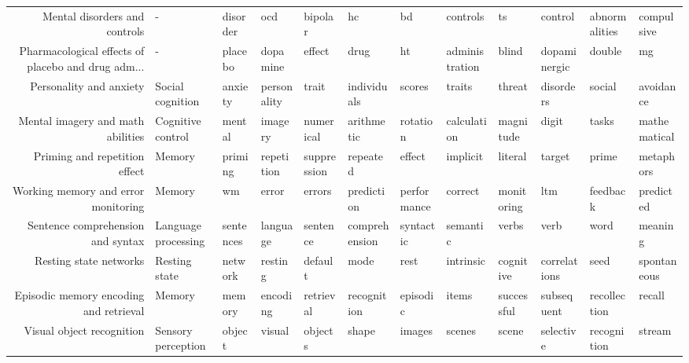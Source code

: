 \begin{tabular}{rlllllllllll}
                     Mental disorders and controls &                   - &         disorder &           ocd &         bipolar &             hc &          bd &       controls &            ts &        control & abnormalities &     compulsive \\
Pharmacological effects of placebo and drug adm... &                   - &          placebo &      dopamine &          effect &           drug &          ht & administration &         blind &   dopaminergic &        double &             mg \\
                           Personality and anxiety &    Social cognition &          anxiety &   personality &           trait &    individuals &      scores &         traits &        threat &      disorders &        social &      avoidance \\
                 Mental imagery and math abilities &   Cognitive control &           mental &       imagery &       numerical &     arithmetic &    rotation &    calculation &     magnitude &          digit &         tasks &   mathematical \\
                     Priming and repetition effect &              Memory &          priming &    repetition &     suppression &       repeated &      effect &       implicit &       literal &         target &         prime &      metaphors \\
               Working memory and error monitoring &              Memory &               wm &         error &          errors &     prediction & performance &        correct &    monitoring &            ltm &      feedback &      predicted \\
                 Sentence comprehension and syntax & Language processing &        sentences &      language &        sentence &  comprehension &   syntactic &       semantic &         verbs &           verb &          word &        meaning \\
                            Resting state networks &       Resting state &          network &       resting &         default &           mode &        rest &      intrinsic &     cognitive &   correlations &          seed &    spontaneous \\
            Episodic memory encoding and retrieval &              Memory &           memory &      encoding &       retrieval &    recognition &    episodic &          items &    successful &     subsequent &  recollection &         recall \\
                         Visual object recognition &  Sensory perception &           object &        visual &         objects &          shape &      images &         scenes &         scene &      selective &   recognition &         stream \\

\end{tabular}
